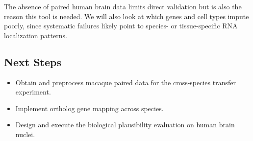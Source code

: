 \documentclass[11pt]{article}
\begin{document}
The absence of paired human brain data limits direct validation but is also the reason this tool is needed. We will also look at which genes and cell types impute poorly, since systematic failures likely point to species- or tissue-specific RNA localization patterns.

\subsection*{Next Steps}

\begin{itemize}[nosep]
    \item Obtain and preprocess macaque paired data for the cross-species transfer experiment.
    \item Implement ortholog gene mapping across species.
    \item Design and execute the biological plausibility evaluation on human brain nuclei.
\end{itemize}
\end{document}

